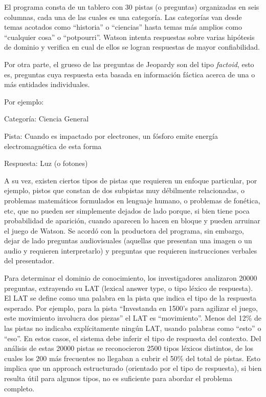 El programa consta de un tablero con 30 pistas (o preguntas) organizadas
en seis columnas, cada una de las cuales es una categoría. Las
categorías van desde temas acotados como
{\textquotedblleft}historia{\textquotedblright} o
{\textquotedblleft}ciencias{\textquotedblright} hasta temas más
amplios como {\textquotedblleft}cualquier cosa{\textquotedblright} o
{\textquotedblleft}potpourri{\textquotedblright}. Watson intenta
respuestas sobre varias hipótesis de dominio y verifica en cual de
ellos se logran respuestas de mayor confiabilidad. 

Por otra parte, el grueso de las preguntas de Jeopardy son del tipo
\textit{factoid}, esto es, preguntas cuya respuesta esta basada en
información fáctica acerca de una o más entidades individuales.


\bigskip

Por ejemplo:

Categoría: Ciencia General

Pista: Cuando es impactado por electrones, un fósforo emite energía
electromagnética de esta forma

Respuesta: Luz (o fotones)


\bigskip

A su vez, existen ciertos tipos de pistas que requieren un enfoque
particular, por ejemplo, pistos que constan de dos subpistas muy
débilmente relacionadas, o problemas matemáticos formulados en
lenguaje humano, o problemas de fonética, etc, que no pueden ser
simplemente dejados de lado porque, si bien tiene poca probabilidad de
aparición, cuando aparecen lo hacen en bloque y pueden arruinar el
juego de Watson. Se acordó con la productora del programa, sin
embargo, dejar de lado preguntas audiovisuales (aquellas que presentan
una imagen o un audio y requieren interpretarlo) y preguntas que
requieren instrucciones verbales del presentador.


\bigskip

Para determinar el dominio de conocimiento, los investigadores
analizaron 20000 preguntas, extrayendo su LAT (lexical answer type, o
tipo léxico de respuesta). El LAT se define como una palabra en la
pista que indica el tipo de la respuesta esperado. Por ejemplo, para la
pista {\textquotedblleft}Investanda en 1500{\textquoteright}s para
agilizar el juego, este movimiento involucra dos
piezas{\textquotedblright} el LAT es
{\textquotedblleft}movimiento{\textquotedblright}. Menos del 12\% de
las pistas no indicaba explícitamente ningún LAT, usando palabras
como {\textquotedblleft}esto{\textquotedblright} o
{\textquotedblleft}eso{\textquotedblright}. En estos casos, el sistema
debe inferir el tipo de respuesta del contexto. Del análisis de estas
20000 pistas se reconocieron 2500 tipos léxicos distintos, de los
cuales los 200 más frecuentes no llegaban a cubrir el 50\% del total
de pistas. Esto implica que un approach estructurado (orientado por el
tipo de respuesta), si bien resulta útil para algunos tipos, no es
suficiente para abordar el problema completo.


